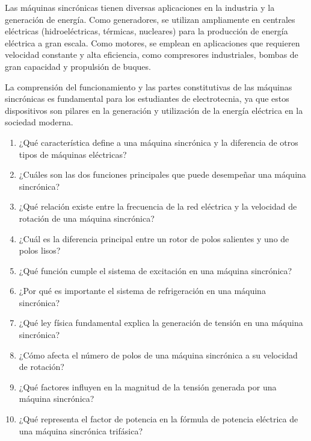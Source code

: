 \documentclass[../main]{subfiles}
\begin{document}

Las máquinas sincrónicas tienen diversas aplicaciones en la industria y la generación de energía. Como generadores, se utilizan ampliamente en centrales eléctricas (hidroeléctricas, térmicas, nucleares) para la producción de energía eléctrica a gran escala. Como motores, se emplean en aplicaciones que requieren velocidad constante y alta eficiencia, como compresores industriales, bombas de gran capacidad y propulsión de buques.

La comprensión del funcionamiento y las partes constitutivas de las máquinas sincrónicas es fundamental para los estudiantes de electrotecnia, ya que estos dispositivos son pilares en la generación y utilización de la energía eléctrica en la sociedad moderna.

\begin{enumerate}
    \item ¿Qué característica define a una máquina sincrónica y la diferencia de otros tipos de máquinas eléctricas?
    \item ¿Cuáles son las dos funciones principales que puede desempeñar una máquina sincrónica?
    \item ¿Qué relación existe entre la frecuencia de la red eléctrica y la velocidad de rotación de una máquina sincrónica?
    \item ¿Cuál es la diferencia principal entre un rotor de polos salientes y uno de polos lisos?
    \item ¿Qué función cumple el sistema de excitación en una máquina sincrónica?
    \item ¿Por qué es importante el sistema de refrigeración en una máquina sincrónica?
    \item ¿Qué ley física fundamental explica la generación de tensión en una máquina sincrónica?
    \item ¿Cómo afecta el número de polos de una máquina sincrónica a su velocidad de rotación?
    \item ¿Qué factores influyen en la magnitud de la tensión generada por una máquina sincrónica?
    \item ¿Qué representa el factor de potencia en la fórmula de potencia eléctrica de una máquina sincrónica trifásica?
\end{enumerate}
\end{document}
